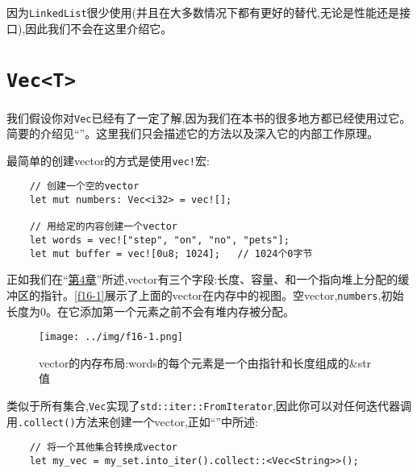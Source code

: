 




因为\texttt{LinkedList}很少使用(并且在大多数情况下都有更好的替代,无论是性能还是接口),因此我们不会在这里介绍它。

\section{\texttt{Vec<T>}}

我们假设你对\texttt{Vec}已经有了一定了解,因为我们在本书的很多地方都已经使用过它。简要的介绍见“”。这里我们只会描述它的方法以及深入它的内部工作原理。

最简单的创建vector的方式是使用\texttt{vec!}宏:
\begin{verbatim}
    // 创建一个空的vector
    let mut numbers: Vec<i32> = vec![];

    // 用给定的内容创建一个vector
    let words = vec!["step", "on", "no", "pets"];
    let mut buffer = vec![0u8; 1024];   // 1024个0字节
\end{verbatim}

正如我们在“\hyperref[ch04]{第4章}”所述,vector有三个字段:长度、容量、和一个指向堆上分配的缓冲区的指针。\autoref{f16-1}展示了上面的vector在内存中的视图。空vector,\texttt{numbers},初始长度为0。在它添加第一个元素之前不会有堆内存被分配。

\begin{figure}[htbp]
    \centering
    \texttt{[image: ../img/f16-1.png]}
    \caption{vector的内存布局:words的每个元素是一个由指针和长度组成的\&str值}
    \label{f16-1}
\end{figure}

类似于所有集合,\texttt{Vec}实现了\texttt{std::iter::FromIterator},因此你可以对任何迭代器调用\texttt{.collect()}方法来创建一个vector,正如“”中所述:
\begin{verbatim}
    // 将一个其他集合转换成vector
    let my_vec = my_set.into_iter().collect::<Vec<String>>();
\end{verbatim}

